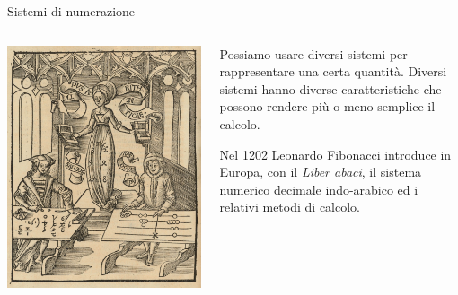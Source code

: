 \documentclass[aspectratio=169, ]{beamer}
\begin{document}
\begin{frame}{Sistemi di numerazione}
    \begin{columns}
        \begin{column}{0.4\textwidth}
            \includegraphics[width=0.9\linewidth]{algoristi_abacisti.jpg}
        \end{column}
        \begin{column}{0.5\textwidth}
            Possiamo usare diversi sistemi per rappresentare una certa quantità. Diversi sistemi hanno diverse caratteristiche che possono rendere più o meno semplice il calcolo.

            Nel 1202 Leonardo Fibonacci introduce in Europa, con il \emph{Liber abaci}, il sistema numerico decimale indo-arabico ed i relativi metodi di calcolo.

        \end{column}
    \end{columns}
\end{frame}
\end{document}
